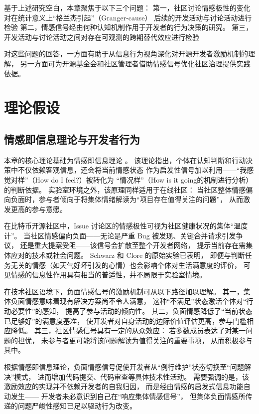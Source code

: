 基于上述研究空白，本章聚焦于以下三个问题：
第一，社区讨论情感极性的变化对在统计意义上“格兰杰引起”（Granger-cause）
后续的开发活动与讨论活动进行检验
第二，情感信号经由何种认知机制作用于开发者的行为决策的研究。
第三，开发活动与讨论活动之间对存在可观测的跨期替代效应进行检验

对这些问题的回答，一方面有助于从信息行为视角深化对开源开发者激励机制的理解，
另一方面可为开源基金会和社区管理者借助情感信号优化社区治理提供实践依据。


\section{理论假设}

\subsection{情感即信息理论与开发者行为}

本章的核心理论基础为情感即信息理论
\cite{schwarz1983moods}。
该理论指出，个体在认知判断和行动决策中不仅依赖客观信息，还会将当前情感状态
作为启发性信号加以利用——“我感觉对样”（How do I feel?）被转化为
“情况样”（How is it going的机制进行分析）的判断依据。
实验室环境之外，该原理同样适用于在线社区：
当社区整体情感偏向负面时，参与者倾向于将集体情绪解读为“项目存在值得关注的问题”，
从而激发更高的参与意愿。

在比特币开源社区中，Issue 讨论区的情感极性可视为社区健康状况的集体“温度计”。
当社区情感偏向负面——无论是严重 Bug 被发现、关键合并请求引发争议，
还是重大提案受阻——该信号会扩散至整个开发者网络，
提示当前存在需集体应对的技术或社会问题。
Schwarz 和 Clore \citeyear{schwarz1983moods}的原始实验已表明，
即便与判断任务无关的情感（如天气好坏引发的心情）也会影响个体对生活满意度的评价，
可见情感的信息性作用具有相当的普适性，并不局限于实验室情境。

在技术社区语境下，负面情感信号的激励机制可从以下路径加以理解。
其一，集体负面情感意味着现有解决方案尚不令人满意，
这种“不满足”状态激活个体对“行动必要性”的感知，
提高了参与活动的倾向性。
其二，负面情感降低了“当前状态已足够好”的满意度基准，
使开发者对自身活动的边际价值评估更高，参与门槛相应降低。
其三，社区情感信号具有一定的从众效应：
若多数成员表达了对某一问题的担忧，
未参与者更可能将该问题解读为值得关注的重要事项，
从而积极参与其中\cite{yang2021differential}。

根据情感即信息理论，负面情感信号促使开发者从“例行维护”状态切换至“问题解决”模式，
进而增加代码提交、代码审查等具体技术性活动。
需要强调的是，该激励效应的实现并不依赖开发者的自我归因，
而是经由情感的启发式信息功能自动发生——
开发者未必意识到自己在“响应集体情感信号”，
但集体负面情感所传递的问题严峻性感知已足以驱动行为改变。

